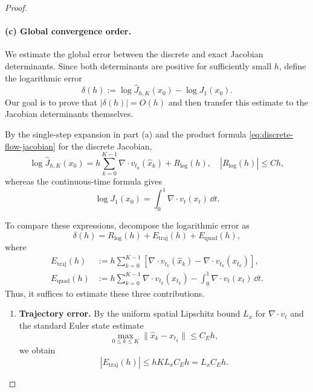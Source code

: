 \documentclass[12pt,a4paper,oneside]{book}
\begin{document}
\begin{proof}
\paragraph{(c) Global convergence order.}

We estimate the global error between the discrete and exact Jacobian determinants. Since both determinants are positive
for sufficiently small $h$, define the logarithmic error
\begin{equation*}
    \delta(h):= \log\widehat J_{h,K}(x_0)-\log J_1(x_0).
\end{equation*}
Our goal is to prove that $|\delta(h)|=O(h)$ and then transfer this estimate to the Jacobian determinants themselves.

By the single-step expansion in part (a) and the product formula \eqref{eq:discrete-flow-jacobian} for the discrete Jacobian,
\begin{equation*}
    \log\widehat J_{h,K}(x_0) = h\sum_{k=0}^{K-1} \nabla\cdot v_{t_k}(\widehat x_k) + R_{\log}(h),
    \quad |R_{\log}(h)|\leq Ch,
\end{equation*}
whereas the continuous-time formula gives
\begin{equation*}
    \log J_1(x_0) = \int_0^1\nabla\cdot v_t(x_t)\,\dd t.
\end{equation*}

To compare these expressions, decompose the logarithmic error as
\begin{equation*}
    \delta(h) = R_{\log}(h)+E_{\mathrm{traj}}(h)+E_{\mathrm{quad}}(h),
\end{equation*}
where
\begin{equation*}
    \begin{aligned}
        E_{\mathrm{traj}}(h) &:= h\sum_{k=0}^{K-1}
        \left[
            \nabla\cdot v_{t_k}(\widehat x_k) - \nabla\cdot v_{t_k}(x_{t_k})
        \right],\\
        E_{\mathrm{quad}}(h) &:= h\sum_{k=0}^{K-1} \nabla\cdot v_{t_k}(x_{t_k}) - \int_0^1\nabla\cdot v_t(x_t)\,\dd t.
    \end{aligned}
\end{equation*}
Thus, it suffices to estimate these three contributions.

\begin{enumerate}
    \item \textbf{Trajectory error.} By the uniform spatial Lipschitz bound $L_x$ for $\nabla\cdot v_t$ and the
        standard Euler state estimate
        \begin{equation*}
            \max_{0\leq k\leq K} \|\widehat x_k-x_{t_k}\|\leq C_Eh,
        \end{equation*}
        we obtain
        \begin{equation*}
            |E_{\mathrm{traj}}(h)| \leq hK L_xC_Eh = L_xC_Eh.
        \end{equation*}


\end{enumerate}
\end{proof}
\end{document}
